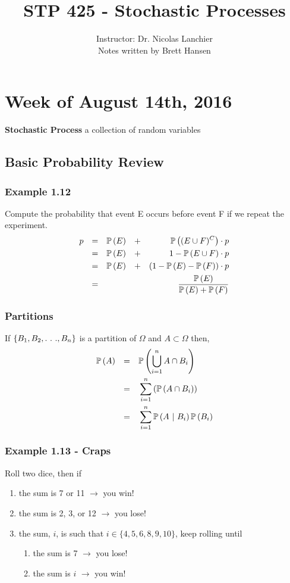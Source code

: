 \documentclass{article}
\title{STP 425 - Stochastic Processes}
\author{
{\large Instructor: Dr. Nicolas Lanchier} \\
		Notes written by Brett Hansen
}
\date{}
\begin{document}
\maketitle
\tableofcontents
\break

\section{Week of August 14th, 2016}

\textbf{Stochastic Process} \quad a collection of random variables

\subsection{Basic Probability Review}
\subsubsection{Example 1.12}
Compute the probability that event E occurs before event F if we repeat the experiment.
\begin{align*}
p &&= &&\mathbb{P}\left(E\right) &&+ &&\mathbb{P}\left((E \cup F)^C\right) \cdot p \\
  &&= &&\mathbb{P}\left(E\right) &&+ &&1 - \mathbb{P}\left(E \cup F\right) \cdot p \\
  &&= &&\mathbb{P}\left(E\right) &&+ &&(1 - \mathbb{P}\left(E\right) - \mathbb{P}\left(F\right)) \cdot p \\
  &&= &&&&&&\frac{\mathbb{P}\left(E\right)}{\mathbb{P}\left(E\right) + \mathbb{P}\left(F\right)}
\end{align*}

\subsubsection{Partitions}
If $\{B_1, B_2, .\ .\ ., B_n\}$ is a partition of $\Omega$ and $A \subset \Omega$ then,
\begin{align*}
\mathbb{P}\left(A\right) 	&&= &&&\mathbb{P}\left(\bigcup_{i=1}^n A \cap B_i\right) \\
			&&= &&&\sum_{i=1}^n \left(\mathbb{P}\left(A \cap B_i\right)\right) \\
			&&= &&&\sum_{i=1}^n \mathbb{P}\left(A\ |\  B_i\right)\mathbb{P}\left(B_i\right)
\end{align*}

\subsubsection{Example 1.13 - Craps}
Roll two dice, then if
\begin{enumerate}
	\item the sum is 7 or 11 $\longrightarrow$ you win!
	\item the sum is 2, 3, or 12 $\longrightarrow$ you lose!
	\item the sum, $i$, is such that $i \in \{4, 5, 6, 8, 9, 10\}$, keep rolling until
	\begin{enumerate}
		\item the sum is 7 $\longrightarrow$ you lose!
		\item the sum is $i$ $\longrightarrow$ you win!
	\end{enumerate}
\end{enumerate}
\end{document}
